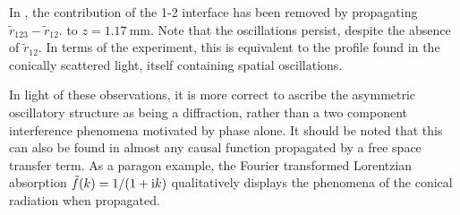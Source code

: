 In , the contribution of the 1-2 interface has been
removed by propagating $\tilde{r}_{123}-\tilde{r}_{12}$.  to
$z=\SI{1.17}{\milli\meter}$.  Note that the oscillations persist, despite
the absence of $\tilde{r}_{12}$.  In terms of the experiment, this is
equivalent to the profile found in the conically scattered light, itself
containing spatial oscillations.

In light of these observations, it is more correct to ascribe the
asymmetric oscillatory structure as being a diffraction, rather than a two
component interference phenomena motivated by phase alone.  It should be
noted that this can also be found in almost any causal function propagated
by a free space transfer term. As a paragon example, the Fourier
transformed Lorentzian absorption $\tilde{f}(k) = 1/(1+{\mathrm{i}} k)$
qualitatively displays the phenomena of the conical radiation when
propagated.


